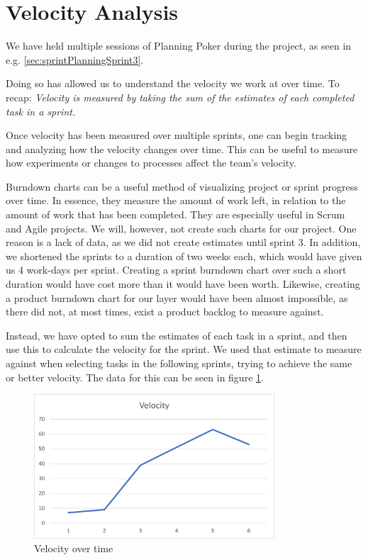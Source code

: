 \section{Velocity Analysis}\label{sec:velocityAnalysis}
We have held multiple sessions of Planning Poker during the project, as seen in e.g. \ref{sec:sprintPlanningSprint3}.

Doing so has allowed us to understand the velocity we work at over time. To recap: \textit{Velocity is measured by taking the sum of the estimates of each completed task in a sprint\cite{sutherlandScrumArtDoing2014}.}

Once velocity has been measured over multiple sprints, one can begin tracking and analyzing how the velocity changes over time. This can be useful to measure how experiments or changes to processes affect the team's velocity.

Burndown charts can be a useful method of visualizing project or sprint progress over time. In essence, they measure the amount of work left, in relation to the amount of work that has been completed. They are especially useful in Scrum and Agile projects\cite{HowCreateBurndown2021}. We will, however, not create such charts for our project. One reason is a lack of data, as we did not create estimates until sprint 3.
In addition, we shortened the sprints to a duration of two weeks each, which would have given us 4 work-days per sprint. Creating a sprint burndown chart over such a short duration would have cost more than it would have been worth.
Likewise, creating a product burndown chart for our layer would have been almost impossible, as there did not, at most times, exist a product backlog to measure against.

Instead, we have opted to sum the estimates of each task in a sprint, and then use this to calculate the velocity for the sprint. We used that estimate to measure against when selecting tasks in the following sprints, trying to achieve the same or better velocity. The data for this can be seen in figure \ref{img:velocityOverTime}.

\begin{figure}[h!]
\centering
\includegraphics[width=0.8\textwidth]{Images/VelocityAnalysis.png}
\caption{Velocity over time}
\label{img:velocityOverTime}
\end{figure}

